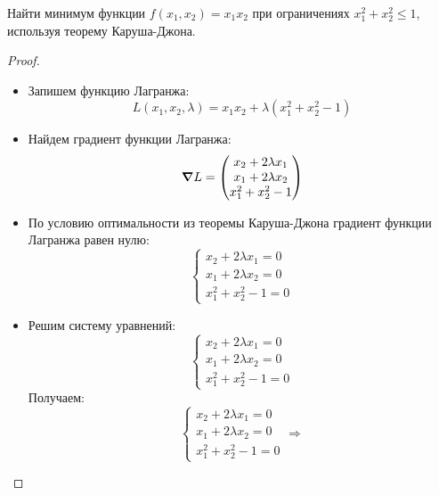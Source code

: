 \renewcommand*{\proofname}{Решение}


\begin{problem}
Найти минимум функции $f(x_1, x_2) = x_1 x_2$ при ограничениях $x_1^2 + x_2^2 \le 1$,
используя теорему Каруша-Джона.
\end{problem}

\begin{proof}
    \
    \begin{itemize}
        \item Запишем функцию Лагранжа:
              \[
                  L(x_1, x_2, \lambda) = x_1 x_2 + \lambda (x_1^2 + x_2^2 - 1)
              \]
        \item Найдем градиент функции Лагранжа:
              \[
                  \grad{L} = \begin{pmatrix}
                      x_2 + 2 \lambda x_1 \\
                      x_1 + 2 \lambda x_2 \\
                      x_1^2 + x_2^2 - 1
                  \end{pmatrix}
              \]
        \item По условию оптимальности из теоремы Каруша-Джона градиент функции Лагранжа равен нулю:
              \[
                  \begin{cases}
                      x_2 + 2 \lambda x_1 = 0 \\
                      x_1 + 2 \lambda x_2 = 0 \\
                      x_1^2 + x_2^2 - 1 = 0
                  \end{cases}
              \]
        \item Решим систему уравнений:
              \[
                  \begin{cases}
                      x_2 + 2 \lambda x_1 = 0 \\
                      x_1 + 2 \lambda x_2 = 0 \\
                      x_1^2 + x_2^2 - 1 = 0
                  \end{cases}
              \]
              Получаем:
              \[
                  \begin{cases}
                      x_2 + 2 \lambda x_1 = 0 \\
                      x_1 + 2 \lambda x_2 = 0 \\
                      x_1^2 + x_2^2 - 1 = 0
                  \end{cases}
                  \Rightarrow
\]
\end{itemize}
\end{proof}
